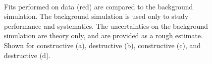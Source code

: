 \begin{figure}[!htpb]
\centering
{}
 \\
\caption{Fits performed on data (red) are compared to the background simulation. The background simulation is used only to study performance and systematics. The uncertainties on the background simulation are theory only, and are provided as a rough estimate.
Shown for \ee constructive (a), \ee destructive (b), \mm constructive (c), and \mm destructive (d).}
\label{fig:ciCiFitVsMc}
\end{figure}

